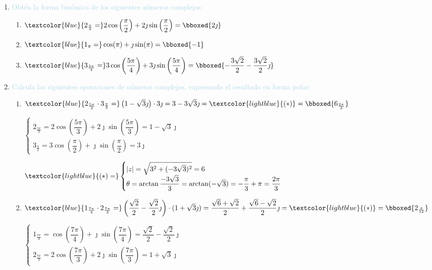 \begin{enumerate}[label=\color{red}\textbf{\arabic*)}, leftmargin=*]
\begin{enumerate}[label=\color{red}\alph*)]
\end{enumerate}
\item \textcolor{lightblue}{Obtén la forma binómica de los siguientes números complejos:}
\begin{enumerate}[label=\color{red}\alph*)]
	\item $\textcolor{blue}{2_{\frac{\pi}{2}}=} 2\cos\left(\dfrac{\pi}{2}\right)+2\jmath\sin\left(\dfrac{\pi}{2}\right)=\bboxed{2\jmath}$
	\item $\textcolor{blue}{1_{\pi}=}\cos(\pi)+\jmath\sin(\pi)=\bboxed{-1}$
	\item $\textcolor{blue}{3_{\frac{5\pi}{4}}=}3\cos\left(\dfrac{5\pi}{4}\right)+3\jmath\sin\left(\dfrac{5\pi}{4}\right)=\bboxed{-\dfrac{3\sqrt{2}}{2}-\dfrac{3\sqrt{2}}{2}\jmath}$
\end{enumerate}
\item \textcolor{lightblue}{Calcula las siguientes operaciones de números complejos, expresando el resultado en forma polar:}
\begin{enumerate}[label=\color{red}\alph*)]
	\item $\textcolor{blue}{2_{\frac{5\pi}{3}}\cdot3_{\frac{\pi}{2}}=} \left(1-\sqrt{3}\jmath\right)\cdot3\jmath=3-3\sqrt{3}\jmath=\textcolor{lightblue}{(\ast)}=\bboxed{6_{\frac{2\pi}{3}}}$
	
	$\begin{cases}
		2_{\frac{5\pi}{3}}=2\cos\left(\dfrac{5\pi}{3}\right)+2\jmath\sin\left(\dfrac{5\pi}{3}\right)=1-\sqrt{3}\jmath\\
		3_{\frac{\pi}{2}}=3\cos\left(\dfrac{\pi}{2}\right)+\jmath\sin\left(\dfrac{\pi}{2}\right)=3\jmath
	\end{cases}$
	
	$\textcolor{lightblue}{(\ast)=}\begin{cases}
		|z|=\sqrt{3^2+(-3\sqrt{3})^2}=6\\
		\theta=\arctan\dfrac{-3\sqrt{3}}{3}=\arctan(-\sqrt{3})=-\dfrac{\pi}{3}+\pi=\dfrac{2\pi}{3}
	\end{cases}$
	\item $\textcolor{blue}{1_{\frac{7\pi}{4}}\cdot2_{\frac{7\pi}{3}}=} \left(\dfrac{\sqrt{2}}{2}-\dfrac{\sqrt{2}}{2}\jmath\right)\cdot(1+\sqrt{3}\jmath)=\dfrac{\sqrt{6}+\sqrt{2}}{2}+\dfrac{\sqrt{6}-\sqrt{2}}{2}\jmath=\textcolor{lightblue}{(\ast)}=\bboxed{2_{\frac{\pi}{12}}}$
	
	$\begin{cases}
		1_{\frac{7\pi}{4}}=\cos\left(\dfrac{7\pi}{4}\right)+\jmath\sin\left(\dfrac{7\pi}{4}\right)=\dfrac{\sqrt{2}}{2}-\dfrac{\sqrt{2}}{2}\jmath\\
		2_{\frac{7\pi}{3}}=2\cos\left(\dfrac{7\pi}{3}\right)+2\jmath\sin\left(\dfrac{7\pi}{3}\right)=1+\sqrt{3}\jmath
	\end{cases}$
	

\end{enumerate}
\end{enumerate}
